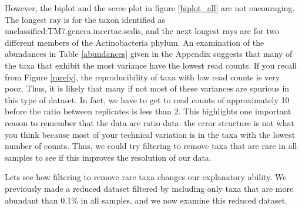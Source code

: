 \documentclass[11pt]{article}\usepackage[]{graphicx}\usepackage[]{color}
\begin{document}
However, the biplot and the scree plot in figure \ref{biplot_all} are not encouraging.  The longest ray is for the taxon identified as unclassified:TM7.genera.incertae.sedis, and the next longest rays are for two different members of the Actinobacteria phylum. An examination of the abundances in Table \ref{abundances} given in the Appendix suggests that many of the taxa that exhibit the most variance have the lowest read counts. If you recall from Figure \ref{rarefy}, the reproducibility of taxa with low read counts is very poor. Thus, it is likely that many if not most of these variances are spurious in this type of dataset. In fact, we have to get to read counts of approximately 10 before the ratio between replicates is less than 2. This highlights one important reason to remember that the data are ratio data: the error structure is not what you think because most of your technical variation is in the taxa with the lowest number of counts. Thus, we could try filtering to remove taxa that are  rare in all samples to see if this improves the resolution of our data. 

Lets see how filtering to remove rare taxa changes our explanatory ability. We previously made a reduced dataset filtered by including only taxa that are more abundant than 0.1\% in all samples, and we now examine this reduced dataset. 
\end{document}
